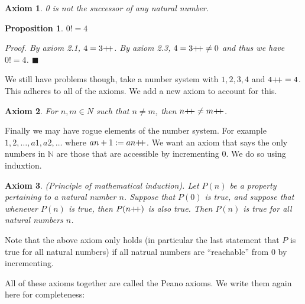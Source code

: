 \documentclass{article}
\newtheorem{axiom}{Axiom}[section]
\newtheorem{proposition}{Proposition}[subsection]
\newcommand{\N}{\mathbb{N}}
\newcommand{\pp}{\mathbin{+\mkern-5mu+}}
\begin{document}
\begin{axiom}
	0 is not the successor of any natural number.
\end{axiom}

\begin{proposition}
	$0 != 4$

	Proof. By axiom 2.1, $4 = 3\pp$. By axiom 2.3, $4 = 3\pp \neq 0$ 
	and thus we have $0 != 4$. \hfill$\blacksquare$
\end{proposition}

We still have problems though, take a number system 
with $1,2,3,4$ and $4\pp = 4$. This adheres to all of the axioms. 
We add a new axiom to account for this. 

\begin{axiom}
	For $n,m \in N$ such that $n \neq m$, then 
	$n\pp \neq m\pp$.
\end{axiom}

Finally we may have rogue elements of the number system. 
For example \\ $1, 2,\dots, a1, a2, \dots$ where $an+1 := an\pp$. 
We want an axiom that says the only numbers in $\N$ are those 
that are accessible by incrementing $0$. We do so using induxtion.

\begin{axiom}
	(Principle of mathematical induction). 
	Let $P(n)$ be a property pertaining to a natural number $n$.
	Suppose that $P(0)$ is true, and suppose that whenever $P(n)$ 
	is true, then $P(n\pp)$ is also true. Then $P(n)$ is true for
	all natural numbers $n$.
\end{axiom}

Note that the above axiom only holds (in particular the last statement 
that $P$ is true for all natural numbers) if all natrual numbers 
are ``reachable'' from $0$ by incrementing.

All of these axioms together are called the Peano axioms. We write 
them again here for completeness:
\end{document}
